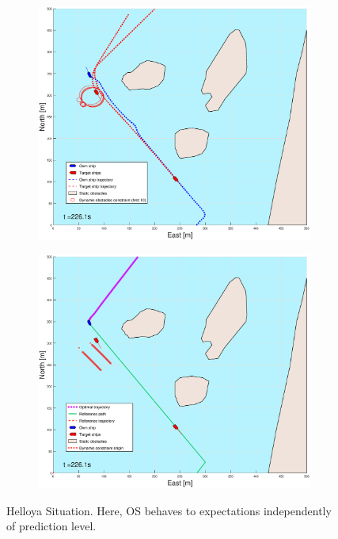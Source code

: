 \begin{figure}[ht]
\begin{subfigure}[b]{0.499\textwidth}
    \end{subfigure}
    \hfill
    \\
    \begin{subfigure}[b]{0.49\textwidth}
        \centering
        \includegraphics[width=\textwidth]{Images/Figures/Helloya/_Simple_0fig1_time=226}
    \end{subfigure}
    \hfill
    \begin{subfigure}[b]{0.499\textwidth}
        \centering
        \includegraphics[width=\textwidth]{Images/Figures/Helloya/_Simple_0fig999_time=226}
    \end{subfigure}
    \hfill
    \caption{Helloya Situation. Here, \gls{OS} behaves to expectations independently of prediction level.}
\end{figure}

